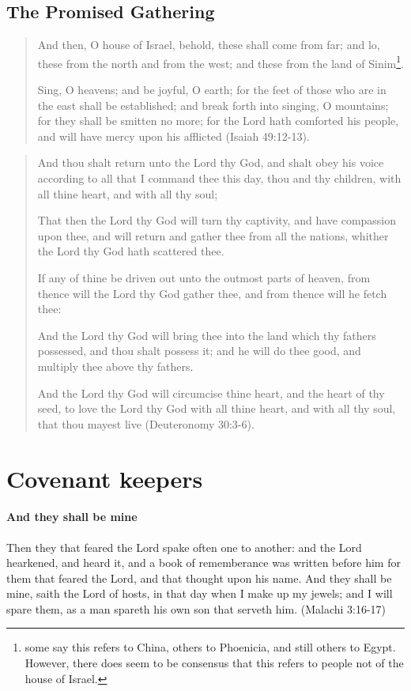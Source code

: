 \subsection{The Promised Gathering}

\begin{quotation}
And then, O house of Israel, behold, these shall come from far; and lo, these from the north and from the west; and these from the land of Sinim\footnote{some say this refers to China, others to Phoenicia, and still others to Egypt. However, there does seem to be consensus that this refers to people not of the house of Israel.}.

Sing, O heavens; and be joyful, O earth; for the feet of those who are in the east shall be established; and break forth into singing, O mountains; for they shall be smitten no more; for the Lord hath comforted his people, and will have mercy upon his afflicted (Isaiah 49:12-13).
\end{quotation}

\begin{quotation}
And thou shalt return unto the Lord thy God, and shalt obey his voice according to all that I command thee this day, thou and thy children, with all thine heart, and with all thy soul;

That then the Lord thy God will turn thy captivity, and have compassion upon thee, and will return and gather thee from all the nations, whither the Lord thy God hath scattered thee. 

If any of thine be driven out unto the outmost parts of heaven, from thence will the Lord thy God gather thee, and from thence will he fetch thee:

And the Lord thy God will bring thee into the land which thy fathers possessed, and thou shalt possess it; and he will do thee good, and multiply thee above thy fathers.

And the Lord thy God will circumcise thine heart, and the heart of thy seed, to love the Lord thy God with all thine heart, and with all thy soul, that thou mayest live (Deuteronomy 30:3-6).
\end{quotation}


\section{Covenant keepers}

\paragraph{And they shall be mine}
Then they that feared the Lord spake often one to another: and the Lord hearkened, and heard it, and a book of rememberance was written before him for them that feared the Lord, and that thought upon his name. And they shall be mine, saith the Lord of hosts, in that day when I make up my jewels; and I will spare them, as a man spareth his own son that serveth him. (Malachi 3:16-17)

